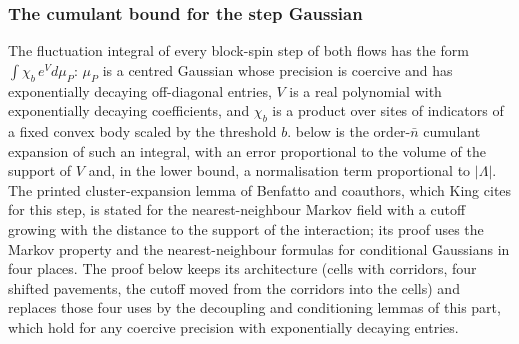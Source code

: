 
\subsubsection*{The cumulant bound for the step Gaussian}

The fluctuation integral of every block-spin step of both flows has the form $\int\chi_b\,e^{V}d\mu_P$: $\mu_P$ is a centred Gaussian whose precision is coercive and has exponentially decaying off-diagonal entries, $V$ is a real polynomial with exponentially decaying coefficients, and $\chi_b$ is a product over sites of indicators of a fixed convex body scaled by the threshold $b$.  below is the order-$\bar n$ cumulant expansion of such an integral, with an error proportional to the volume of the support of $V$ and, in the lower bound, a normalisation term proportional to $|\Lambda|$. The printed cluster-expansion lemma of Benfatto and coauthors, which King cites for this step, is stated for the nearest-neighbour Markov field with a cutoff growing with the distance to the support of the interaction; its proof uses the Markov property and the nearest-neighbour formulas for conditional Gaussians in four places. The proof below keeps its architecture (cells with corridors, four shifted pavements, the cutoff moved from the corridors into the cells) and replaces those four uses by the decoupling and conditioning lemmas of this part, which hold for any coercive precision with exponentially decaying entries.


